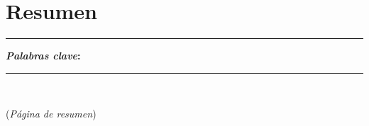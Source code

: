 \chapter*{Resumen} %
\noindent \rule{0.9\textwidth}{1.0pt} \newline
\noindent \textbf{\textit{Palabras clave}: }\newline
\noindent \rule{0.9\textwidth}{1.0pt}
\ \newline
\par
\linespread{1.3}
{\Huge{(\textit{Página de resumen})}}
\clearpage %



